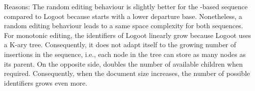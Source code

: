 \begin{asparadesc}
\item [Reasons:] The random editing behaviour is slightly better for the
  \LSEQ-based sequence compared to Logoot because \LSEQ starts with a lower
  departure base. Nonetheless, a random editing behaviour leads to a same space
  complexity for both sequences. For monotonic editing, the identifiers of
  Logoot linearly grow because Logoot uses a K-ary tree. Consequently, it does
  not adapt itself to the growing number of insertions in the sequence, i.e.,
  each node in the tree can store as many nodes as its parent. On the opposite
  side, \LSEQ doubles the number of available children when
  required. Consequently, when the document size increases, the number of
  possible identifiers grows even more.
\end{asparadesc}

\ \\

